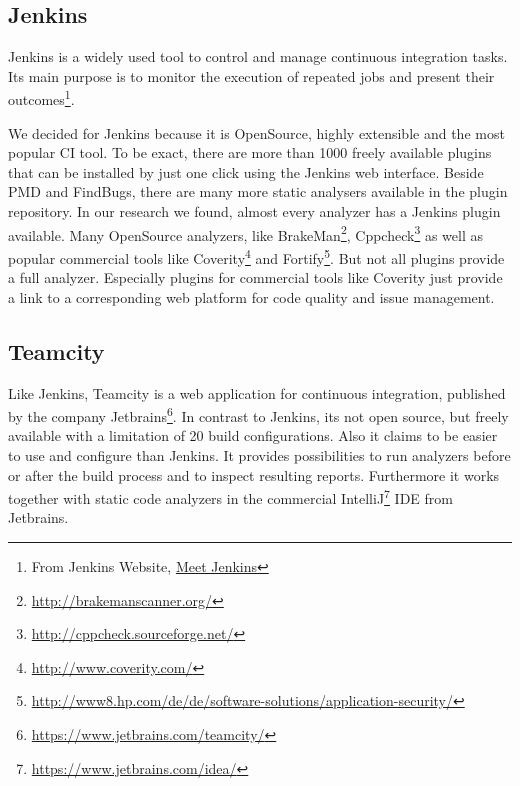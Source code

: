 \documentclass[conference]{IEEEtran}
\begin{document}
\subsection{Jenkins}
\label{subsec:jenkins}
Jenkins is a widely used tool to control and manage continuous integration tasks. Its main purpose is to monitor the execution of repeated jobs and present their outcomes\footnote{From Jenkins Website, \href{https://wiki.jenkins-ci.org/display/JENKINS/Meet+Jenkins}{Meet Jenkins}}.

We decided for Jenkins because it is OpenSource, highly extensible and the most popular CI tool. To be exact, there are more than 1000 freely available plugins that can be installed by just one click using the Jenkins web interface.
Beside PMD and FindBugs, there are many more static analysers available in the plugin repository.
In our research we found, almost every analyzer has a Jenkins plugin available.
Many OpenSource analyzers, like BrakeMan\footnote{\href{http://brakemanscanner.org/}{http://brakemanscanner.org/}}, Cppcheck\footnote{\href{http://cppcheck.sourceforge.net/}{http://cppcheck.sourceforge.net/}} as well as popular commercial tools like Coverity\footnote{\href{http://www.coverity.com/}{http://www.coverity.com/}} and Fortify\footnote{\href{http://www8.hp.com/de/de/software-solutions/application-security/}{http://www8.hp.com/de/de/software-solutions/application-security/}}.
But not all plugins provide a full analyzer.
Especially plugins for commercial tools like Coverity just provide a link to a corresponding web platform for code quality and issue management. 




\subsection{Teamcity}
\label{subsec:teamcity}
Like Jenkins, Teamcity is a web application for continuous integration, published by the company Jetbrains\footnote{\href{https://www.jetbrains.com/teamcity/}{https://www.jetbrains.com/teamcity/}}. In contrast to Jenkins, its not open source, but freely available with a limitation of 20 build configurations.
Also it claims to be easier to use and configure than Jenkins.
It provides possibilities to run analyzers before or after the build process and to inspect resulting reports.
Furthermore it works together with static code analyzers in the commercial IntelliJ\footnote{\href{https://www.jetbrains.com/idea/}{https://www.jetbrains.com/idea/}} IDE from Jetbrains.
\end{document}
